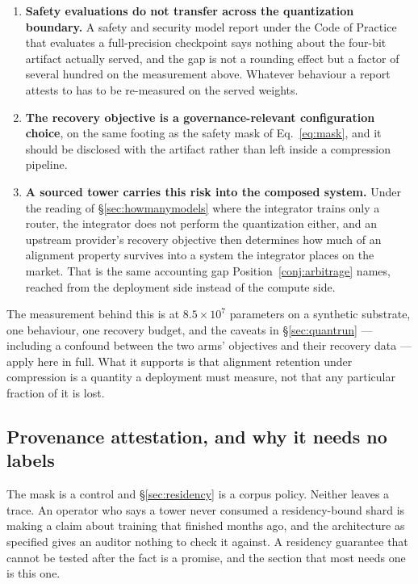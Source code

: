 \documentclass[11pt]{article}
\begin{document}
\begin{enumerate}[label=(\arabic*),itemsep=3pt]
\item \textbf{Safety evaluations do not transfer across the quantization boundary.} A safety and security model report under the Code of Practice \cite{gpaicop2025} that evaluates a full-precision checkpoint says nothing about the four-bit artifact actually served, and the gap is not a rounding effect but a factor of several hundred on the measurement above. Whatever behaviour a report attests to has to be re-measured on the served weights.
\item \textbf{The recovery objective is a governance-relevant configuration choice}, on the same footing as the safety mask of Eq.~\eqref{eq:mask}, and it should be disclosed with the artifact rather than left inside a compression pipeline.
\item \textbf{A sourced tower carries this risk into the composed system.} Under the reading of \S\ref{sec:howmanymodels} where the integrator trains only a router, the integrator does not perform the quantization either, and an upstream provider's recovery objective then determines how much of an alignment property survives into a system the integrator places on the market. That is the same accounting gap Position~\ref{conj:arbitrage} names, reached from the deployment side instead of the compute side.
\end{enumerate}

The measurement behind this is at $8.5\times10^{7}$ parameters on a synthetic substrate, one behaviour, one recovery budget, and the caveats in \S\ref{sec:quantrun} --- including a confound between the two arms' objectives and their recovery data --- apply here in full. What it supports is that alignment retention under compression is a quantity a deployment must measure, not that any particular fraction of it is lost.

\subsection{Provenance attestation, and why it needs no labels}
\label{sec:provenance}

The mask is a control and \S\ref{sec:residency} is a corpus policy. Neither leaves a trace. An operator who says a tower never consumed a residency-bound shard is making a claim about training that finished months ago, and the architecture as specified gives an auditor nothing to check it against. A residency guarantee that cannot be tested after the fact is a promise, and the section that most needs one is this one.
\end{document}
